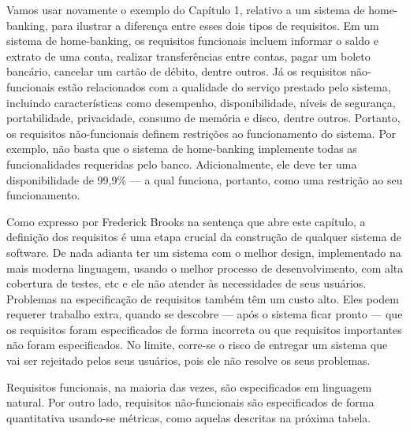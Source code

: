 \documentclass[
  11pt,
  twoside]{book}
\begin{document}
 Vamos usar novamente o exemplo do
Capítulo 1, relativo a um sistema de home-banking, para ilustrar a
diferença entre esses dois tipos de requisitos. Em um sistema de
home-banking, os requisitos funcionais incluem informar o saldo e
extrato de uma conta, realizar transferências entre contas, pagar um
boleto bancário, cancelar um cartão de débito, dentre outros. Já os
requisitos não-funcionais estão relacionados com a qualidade do serviço
prestado pelo sistema, incluindo características como desempenho,
disponibilidade, níveis de segurança, portabilidade, privacidade,
consumo de memória e disco, dentre outros. Portanto, os requisitos
não-funcionais definem restrições ao funcionamento do sistema. Por
exemplo, não basta que o sistema de home-banking implemente todas as
funcionalidades requeridas pelo banco. Adicionalmente, ele deve ter uma
disponibilidade de 99,9\% --- a qual funciona, portanto, como uma
restrição ao seu funcionamento.

 Como expresso por Frederick Brooks na sentença
que abre este capítulo, a definição dos requisitos é uma etapa crucial
da construção de qualquer sistema de software. De nada adianta ter um
sistema com o melhor design, implementado na mais moderna linguagem,
usando o melhor processo de desenvolvimento, com alta cobertura de
testes, etc e ele não atender às necessidades de seus usuários.
Problemas na especificação de requisitos também têm um custo alto. Eles
podem requerer trabalho extra, quando se descobre --- após o sistema
ficar pronto --- que os requisitos foram especificados de forma
incorreta ou que requisitos importantes não foram especificados. No
limite, corre-se o risco de entregar um sistema que vai ser rejeitado
pelos seus usuários, pois ele não resolve os seus problemas.

Requisitos funcionais, na maioria das vezes, são especificados em
linguagem natural. Por outro lado, requisitos não-funcionais são
especificados de forma quantitativa usando-se métricas, como aquelas
descritas na próxima tabela.
\end{document}
